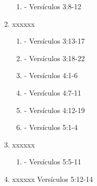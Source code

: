 \documentclass[9pt,letterpaper]{article}
\begin{document}
\begin{enumerate}
\begin{enumerate}
			\item  - Versículos 3:8-12
		\end{enumerate}
		\item xxxxxx
		\begin{enumerate}
			\item  - Versículos 3:13-17 
			\item  - Versículos 3:18-22
			\item  - Versículos 4:1-6
			\item  - Versículos 4:7-11
			\item  - Versículos 4:12-19
			\item  - Versículos 5:1-4
		\end{enumerate}
		\item xxxxxx
		\begin{enumerate}
			\item  - Versículos 5:5-11
		\end{enumerate}
		\item xxxxxx Versículos 5:12-14
	\end{enumerate}
\end{document}

